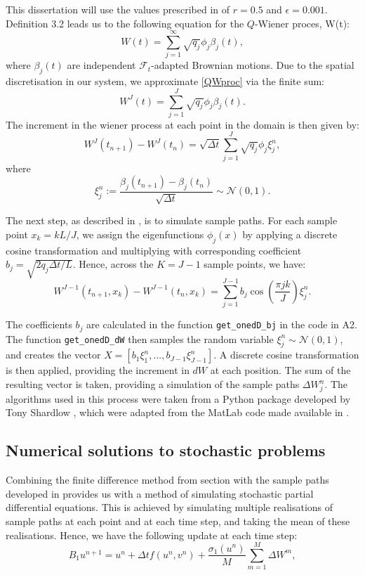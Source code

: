 \documentclass[12pt]{article}
\begin{document}
This dissertation will use the values prescribed in \cite{Lord} of $r = 0.5$ 
and $\epsilon = 0.001$. Definition 3.2 leads us to the following equation for the $Q$-Wiener proces, W(t): 
\begin{equation}\label{QWproc}
W(t) = \sum_{j=1}^\infty\sqrt{q_j}\phi_j\beta_j(t),
\end{equation}
where $\beta_j(t)$ are independent $\mathcal{F}_t$-adapted Brownian motions. Due to the spatial discretisation in our system, we approximate \eqref{QWproc} via the finite sum:  
\begin{equation*}
W^J(t) = \sum_{j=1}^J\sqrt{q_j}\phi_j\beta_j(t).    
\end{equation*}
The increment in the wiener process at each point in the domain is then given by:
\begin{equation*}
    W^J(t_{n+1}) - W^J(t_n) = \sqrt{\Delta t} \sum_{j=1}^J\sqrt{q_j}\phi_j\xi_j^n,
\end{equation*}
where
$$\xi_j^n := \frac{\beta_j(t_{n+1}) - \beta_j(t_n)}{\sqrt{\Delta t}} \sim \mathcal{N}(0,1).$$ 

The next step, as described in \cite{Lord}, is to simulate sample paths. For each sample point $x_k = kL/J$, we assign the eigenfunctions $\phi_j(x)$ by applying a discrete cosine transformation and multiplying with corresponding coefficient $b_j = \sqrt{2q_j\Delta t/L}$. Hence, across the $K = J-1$ sample points, we have:
\begin{equation}\label{samplepath}
    W^{J-1}(t_{n+1},x_k) - W^{J-1}(t_{n},x_k) = \sum_{j=1}^{J-1} b_j \cos\left(\frac{\pi jk}{J}\right)\xi_j^n.
\end{equation}

The coefficients $b_j$ are calculated in the function \texttt{get\_onedD\_bj} in the code in A2. The function \texttt{get\_onedD\_dW} then samples the random variable $\xi_j^n \sim \mathcal{N}(0,1)$, and creates the vector $X = \left[b_1\xi_1^n,...,b_{J-1}\xi_{J-1}^n\right]$. A discrete cosine transformation is then applied, providing the increment in $dW$ at each position. The sum of the resulting vector is taken, providing a simulation of the sample paths $\Delta W_j^n$. The algorithms used in this process were taken from a Python package developed by Tony Shardlow \cite{Shardlow}, which were adapted from the MatLab code made available in \cite{Lord}.   

\subsection{Numerical solutions to stochastic problems}
Combining the finite difference method from section  with the sample paths developed in  provides us with a method of simulating stochastic partial differential equations. This is achieved by simulating multiple realisations of sample paths at each point and at each time step, and taking the mean of these realisations. Hence, we have the following update at each time step:
\begin{equation}
    B_1 u^{n+1} = u^n + \Delta t f(u^n, v^n) + \frac{\sigma_1(u^n)}{M}\sum_{m=1}^M\Delta W^m,
\end{equation}
\end{document}
